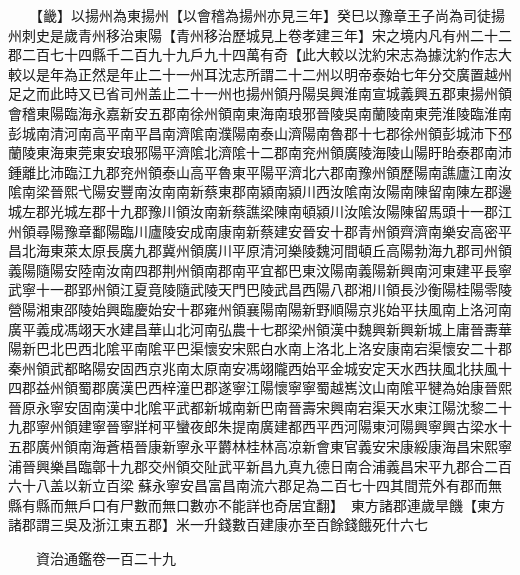 　　【畿】以揚州為東揚州【以會稽為揚州亦見三年】癸巳以豫章王子尚為司徒揚州刺史是歲青州移治東陽【青州移治歷城見上卷孝建三年】宋之境内凡有州二十二郡二百七十四縣千二百九十九戶九十四萬有奇【此大較以沈約宋志為據沈約作志大較以是年為正然是年止二十一州耳沈志所謂二十二州以明帝泰始七年分交廣置越州足之而此時又已省司州盖止二十一州也揚州領丹陽吳興淮南宣城義興五郡東揚州領會稽東陽臨海永嘉新安五郡南徐州領南東海南琅邪晉陵吳南蘭陵南東莞淮陵臨淮南彭城南清河南高平南平昌南濟隂南濮陽南泰山濟陽南魯郡十七郡徐州領彭城沛下邳蘭陵東海東莞東安琅邪陽平濟隂北濟隂十二郡南兖州領廣陵海陵山陽盱眙泰郡南沛鍾離比沛臨江九郡兖州領泰山高平魯東平陽平濟北六郡南豫州領歷陽南譙廬江南汝隂南梁晉熙弋陽安豐南汝南南新蔡東郡南潁南潁川西汝隂南汝陽南陳留南陳左郡邊城左郡光城左郡十九郡豫川領汝南新蔡譙梁陳南頓潁川汝隂汝陽陳留馬頭十一郡江州領尋陽豫章鄱陽臨川廬陵安成南康南新蔡建安晉安十郡青州領齊濟南樂安高密平昌北海東萊太原長廣九郡冀州領廣川平原清河樂陵魏河間頓丘高陽勃海九郡司州領義陽隨陽安陸南汝南四郡荆州領南郡南平宜都巴東汶陽南義陽新興南河東建平長寧武寧十一郡郢州領江夏竟陵隨武陵天門巴陵武昌西陽八郡湘川領長沙衡陽桂陽零陵營陽湘東邵陵始興臨慶始安十郡雍州領襄陽南陽新野順陽京兆始平扶風南上洛河南廣平義成馮翊天水建昌華山北河南弘農十七郡梁州領漢中魏興新興新城上庸晉夀華陽新巴北巴西北隂平南隂平巴渠懷安宋熙白水南上洛北上洛安康南宕渠懷安二十郡秦州領武都略陽安固西京兆南太原南安馮翊隴西始平金城安定天水西扶風北扶風十四郡益州領蜀郡廣漢巴西梓潼巴郡遂寧江陽懷寧寧蜀越嶲汶山南隂平犍為始康晉熙晉原永寧安固南漢中北隂平武都新城南新巴南晉壽宋興南宕渠天水東江陽沈黎二十九郡寧州領建寧晉寧牂柯平蠻夜郎朱提南廣建都西平西河陽東河陽興寧興古梁水十五郡廣州領南海蒼梧晉康新寧永平欝林桂林高凉新會東官義安宋康綏康海昌宋熙寧浦晉興樂昌臨鄣十九郡交州領交阯武平新昌九真九德日南合浦義昌宋平九郡合二百六十八盖以新立百梁蘇永寧安昌富昌南流六郡足為二百七十四其間荒外有郡而無縣有縣而無戶口有尸數而無口數亦不能詳也奇居宜翻】　東方諸郡連歲旱饑【東方諸郡謂三吳及浙江東五郡】米一升錢數百建康亦至百餘錢餓死什六七

　　資治通鑑卷一百二十九  
    


 


 



 

 
  







 


　　
　　
　
　
　


　　

